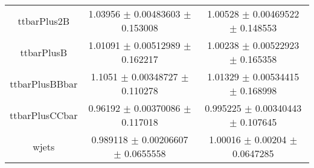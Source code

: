 \begin{table}
\begin{tabular}{ccc}
ttbarPlus2B & \num{1.03956} $\pm$ \num{0.00483603} $\pm$ \num{0.153008} & \num{1.00528} $\pm$ \num{0.00469522} $\pm$ \num{0.148553}\\
ttbarPlusB & \num{1.01091} $\pm$ \num{0.00512989} $\pm$ \num{0.162217} & \num{1.00238} $\pm$ \num{0.00522923} $\pm$ \num{0.165358}\\
ttbarPlusBBbar & \num{1.1051} $\pm$ \num{0.00348727} $\pm$ \num{0.110278} & \num{1.01329} $\pm$ \num{0.00534415} $\pm$ \num{0.168998}\\
ttbarPlusCCbar & \num{0.96192} $\pm$ \num{0.00370086} $\pm$ \num{0.117018} & \num{0.995225} $\pm$ \num{0.00340443} $\pm$ \num{0.107645}\\
wjets & \num{0.989118} $\pm$ \num{0.00206607} $\pm$ \num{0.0655558} & \num{1.00016} $\pm$ \num{0.00204} $\pm$ \num{0.0647285}\\
\bottomrule
\end{tabular}
\end{table}